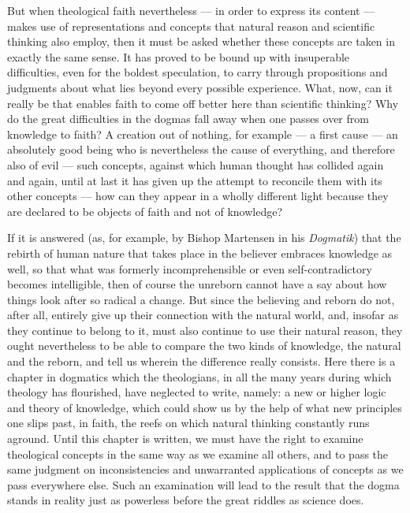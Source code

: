 \documentclass[12pt,a4paper]{article}
\begin{document}
But when theological faith nevertheless --- in order to express its content ---
makes use of representations and concepts that natural reason and scientific
thinking also employ, then it must be asked whether these concepts are taken in
exactly the same sense. It has proved to be bound up with insuperable
difficulties, even for the boldest speculation, to carry through propositions
and judgments about what lies beyond every possible experience. What, now, can
it really be that enables faith to come off better here than scientific
thinking? Why do the great difficulties in the dogmas fall away when one passes
over from knowledge to faith? A creation out of nothing, for example --- a
first cause --- an absolutely good being who is nevertheless the cause of
everything, and therefore also of evil --- such concepts, against which human
thought has collided again and again, until at last it has given up the attempt
to reconcile them with its other concepts --- how can they appear in a wholly
different light because they are declared to be objects of faith and not of
knowledge?

If it is answered (as, for example, by Bishop Martensen in his
\emph{Dogmatik}) that the rebirth of human nature that takes place in the
believer embraces knowledge as well, so that what was formerly incomprehensible
or even self-contradictory becomes intelligible, then of course the unreborn
cannot have a say about how things look after so radical a change. But since
the believing and reborn do not, after all, entirely give up their connection
with the natural world, and, insofar as they continue to belong to it, must
also continue to use their natural reason, they ought nevertheless to be able to
compare the two kinds of knowledge, the natural and the reborn, and tell us
wherein the difference really consists. Here there is a chapter in dogmatics
which the theologians, in all the many years during which theology has
flourished, have neglected to write, namely: a new or higher logic and theory of
knowledge, which could show us by the help of what new principles one slips
past, in faith, the reefs on which natural thinking constantly runs aground.
Until this chapter is written, we must have the right to examine theological
concepts in the same way as we examine all others, and to pass the same judgment
on inconsistencies and unwarranted applications of concepts as we pass
everywhere else. Such an examination will lead to the result that the dogma
stands in reality just as powerless before the great riddles as science does.
\end{document}
